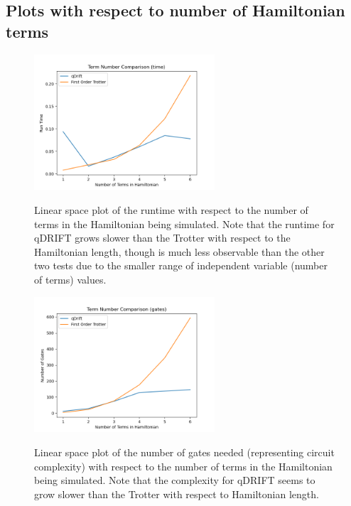 \documentclass[letterpaper, 11pt]{article}
\begin{document}
\subsection*{Plots with respect to number of Hamiltonian terms}
\begin{figure}[H]
\centering
\includegraphics[width = 0.6\textwidth]{plots/num_terms_time_comp.png}
\label{html}
\caption{Linear space plot of the runtime with respect to the number of terms in the Hamiltonian being simulated. Note that the runtime for qDRIFT grows slower than the Trotter with respect to the Hamiltonian length, though is much less observable than the other two tests due to the smaller range of independent variable (number of terms) values.}
\end{figure}
\begin{figure}[H]
\centering
\includegraphics[width = 0.6\textwidth]{plots/num_terms_gates_comp.png}
\label{html}
\caption{Linear space plot of the number of gates needed (representing circuit complexity) with respect to the number of terms in the Hamiltonian being simulated. Note that the complexity for qDRIFT seems to grow slower than the Trotter with respect to Hamiltonian length.}
\end{figure}
\end{document}
